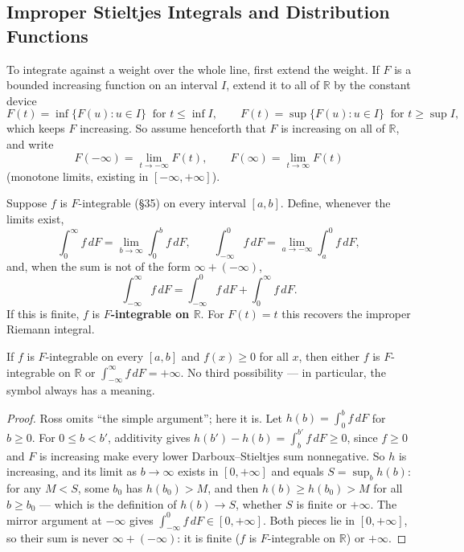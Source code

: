 \documentclass[11pt]{report}
\begin{document}
\subsection{Improper Stieltjes Integrals and Distribution Functions}

To integrate against a weight over the whole line, first extend the weight. If $F$ is a bounded increasing function on an interval $I$, extend it to all of $\mathbb{R}$ by the constant device
\[
F(t) = \inf\{ F(u) : u \in I \} \ \text{ for } t \leq \inf I, \qquad
F(t) = \sup\{ F(u) : u \in I \} \ \text{ for } t \geq \sup I,
\]
which keeps $F$ increasing. So assume henceforth that $F$ is increasing on all of $\mathbb{R}$, and write
\[
F(-\infty) = \lim_{t \to -\infty} F(t), \qquad F(\infty) = \lim_{t \to \infty} F(t)
\]
(monotone limits, existing in $[-\infty, +\infty]$).

\begin{defbox}
Suppose $f$ is $F$-integrable (\S 35) on every interval $[a,b]$. Define, whenever the limits exist,
\[
\int_0^\infty f\,dF = \lim_{b\to\infty} \int_0^b f\,dF, \qquad
\int_{-\infty}^0 f\,dF = \lim_{a\to-\infty} \int_a^0 f\,dF,
\]
and, when the sum is not of the form $\infty + (-\infty)$,
\[
\int_{-\infty}^\infty f\,dF = \int_{-\infty}^0 f\,dF + \int_0^\infty f\,dF.
\]
If this is finite, $f$ is \textbf{$F$-integrable on $\mathbb{R}$}. For $F(t) = t$ this recovers the improper Riemann integral.
\end{defbox}

\begin{thmbox}
If $f$ is $F$-integrable on every $[a,b]$ and $f(x) \geq 0$ for all $x$, then either $f$ is $F$-integrable on $\mathbb{R}$ or $\int_{-\infty}^\infty f\,dF = +\infty$. No third possibility --- in particular, the symbol always has a meaning.
\end{thmbox}

\begin{proof}
Ross omits ``the simple argument''; here it is. Let $h(b) = \int_0^b f\,dF$ for $b \geq 0$. For $0 \leq b < b'$, additivity gives $h(b') - h(b) = \int_b^{b'} f\,dF \geq 0$, since $f \geq 0$ and $F$ is increasing make every lower Darboux--Stieltjes sum nonnegative. So $h$ is increasing, and its limit as $b \to \infty$ exists in $[0, +\infty]$ and equals $S = \sup_b h(b)$: for any $M < S$, some $b_0$ has $h(b_0) > M$, and then $h(b) \geq h(b_0) > M$ for all $b \geq b_0$ --- which is the definition of $h(b) \to S$, whether $S$ is finite or $+\infty$. The mirror argument at $-\infty$ gives $\int_{-\infty}^0 f\,dF \in [0, +\infty]$. Both pieces lie in $[0, +\infty]$, so their sum is never $\infty + (-\infty)$: it is finite ($f$ is $F$-integrable on $\mathbb{R}$) or $+\infty$.
\end{proof}
\end{document}
